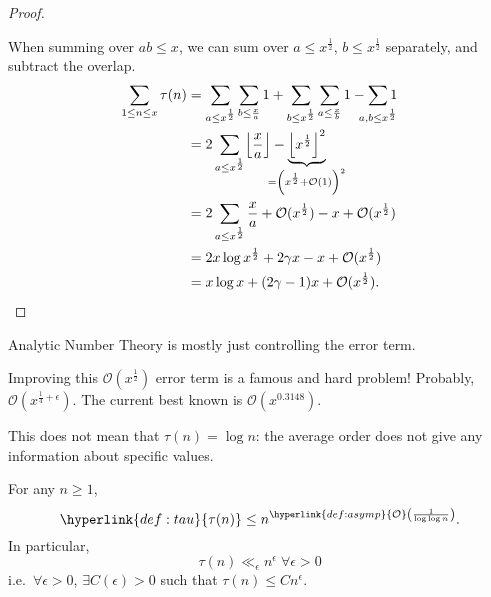\documentclass{article}
\newcommand{\1}{\mathbbm{1}}
\newcommand{\bigO}{\mathcal{O}}
\DeclarePairedDelimiter\floor{\lfloor}{\rfloor}
\begin{document}
\begin{proof}
\begin{center}
  \end{center}
  When summing over $ab \leq x$, we can sum over $a \leq x^{\frac{1}{2}}$, $b \leq x^{\frac{1}{2}}$ separately, and subtract the overlap.
  \begin{align*}
    \sum_{1 \leq n \leq x} \tau(n) &= \sum_{a \leq x^{\frac{1}{2}}} \sum_{b \leq \frac{x}{a}} 1 + \sum_{b \leq x^{\frac{1}{2}}} \sum_{a \leq \frac{x}{b}} 1 - \sum_{\mathclap{a,b \leq x^{\frac{1}{2}}}} 1 \\
                                   &= 2 \sum_{a \leq x^{\frac{1}{2}}} \floor*{\frac{x}{a}} - \underbrace{\floor*{x^{\frac{1}{2}}}^2}_{\mathclap{=\left(x^{\frac{1}{2}} + \bigO(1)\right)^2}} \\
                                   &= 2 \sum_{a \leq x^{\frac{1}{2}}} \frac{x}{a} + \bigO(x^{\frac{1}{2}}) - x + \bigO(x^{\frac{1}{2}}) \\
                                   &= 2 x \log x^{\frac{1}{2}} + 2 \gamma x - x + \bigO(x^{\frac{1}{2}}) \\
                                   &= x \log x + (2 \gamma - 1) x + \bigO(x^{\frac{1}{2}}). \qedhere
  \end{align*}
\end{proof}
Analytic Number Theory is mostly just controlling the error term.
\begin{remark}
  Improving this $\bigO(x^{\frac{1}{2}})$ error term is a famous and hard problem! Probably, $\bigO(x^{\frac{1}{4} + \epsilon})$. The current best known is $\bigO(x^{0.3148})$.

  This does not mean that $\tau(n) = \log n$: the average order does not give any information about specific values.
\end{remark}
\begin{nthm}\label{thm:5}
  \newlec
  For any $n \geq 1$,
  \begin{equation*}
    \hyperlink{def:tau}{\tau(n)} \leq n^{\hyperlink{def:asymp}{\bigO}\left(\frac{1}{\log \log n}\right)}.
  \end{equation*}
  In particular,
  \begin{equation*}
    \tau(n) \ll_\epsilon n^\epsilon \; \forall \epsilon > 0
  \end{equation*}
  i.e.\ $\forall \epsilon > 0$, $\exists C(\epsilon) > 0$ such that $\tau(n) \leq C n^\epsilon$.
\end{nthm}
\end{document}
